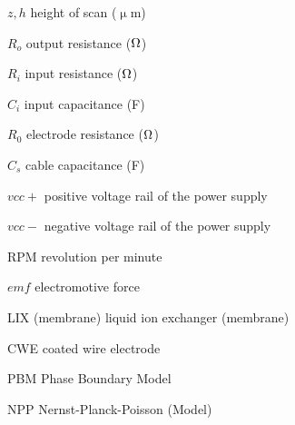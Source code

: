 $z, h$ \dotfill height of scan ($\upmu$m)

$R_o$ \dotfill output resistance ($\ohm$)

$R_i$ \dotfill input resistance ($\ohm$)

$C_i$ \dotfill input capacitance (F)

$R_0$ \dotfill electrode resistance ($\ohm$)

$C_s$ \dotfill cable capacitance (F)

$vcc+$ \dotfill positive voltage rail of the power supply

$vcc-$ \dotfill negative voltage rail of the power supply

RPM \dotfill revolution per minute

$emf$ \dotfill electromotive force

LIX (membrane) \dotfill liquid ion exchanger (membrane)

CWE \dotfill coated wire electrode

PBM \dotfill Phase Boundary Model

NPP \dotfill Nernst-Planck-Poisson (Model)
